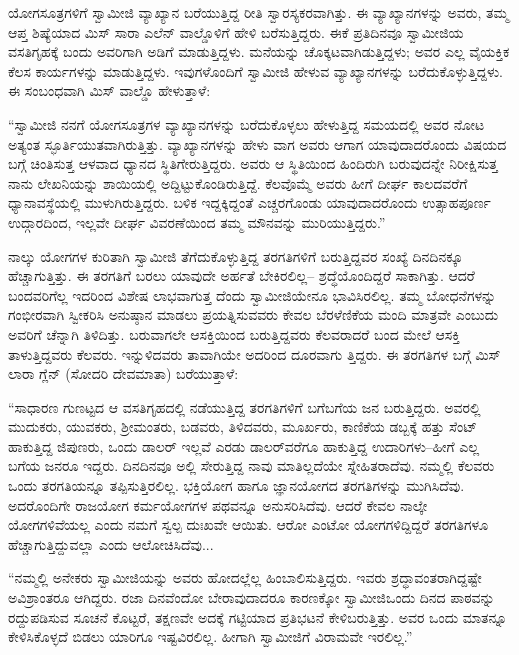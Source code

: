 ಯೋಗಸೂತ್ರಗಳಿಗೆ ಸ್ವಾಮೀಜಿ ವ್ಯಾಖ್ಯಾನ ಬರೆಯುತ್ತಿದ್ದ ರೀತಿ ಸ್ವಾರಸ್ಯಕರವಾಗಿತ್ತು. ಈ ವ್ಯಾಖ್ಯಾನಗಳನ್ನು ಅವರು, ತಮ್ಮ ಆಪ್ತ ಶಿಷ್ಯೆಯಾದ ಮಿಸ್ ಸಾರಾ ಎಲೆನ್ ವಾಲ್ಡೊಳಿಗೆ ಹೇಳಿ ಬರೆಸುತ್ತಿದ್ದರು. ಈಕೆ ಪ್ರತಿದಿನವೂ ಸ್ವಾಮೀಜಿಯ ವಸತಿಗೃಹಕ್ಕೆ ಬಂದು ಅವರಿಗಾಗಿ ಅಡಿಗೆ ಮಾಡುತ್ತಿದ್ದಳು. ಮನೆಯನ್ನು ಚೊಕ್ಕಟವಾಗಿಡುತ್ತಿದ್ದಳು; ಅವರ ಎಲ್ಲ ವೈಯಕ್ತಿಕ ಕೆಲಸ ಕಾರ್ಯಗಳನ್ನು ಮಾಡುತ್ತಿದ್ದಳು. ಇವುಗಳೊಂದಿಗೆ ಸ್ವಾಮೀಜಿ ಹೇಳುವ ವ್ಯಾಖ್ಯಾನಗಳನ್ನು ಬರೆದುಕೊಳ್ಳುತ್ತಿದ್ದಳು. ಈ ಸಂಬಂಧವಾಗಿ ಮಿಸ್ ವಾಲ್ಡೊ ಹೇಳುತ್ತಾಳೆ:

“ಸ್ವಾಮೀಜಿ ನನಗೆ ಯೋಗಸೂತ್ರಗಳ ವ್ಯಾಖ್ಯಾನಗಳನ್ನು ಬರೆದುಕೊಳ್ಳಲು ಹೇಳುತ್ತಿದ್ದ ಸಮಯದಲ್ಲಿ ಅವರ ನೋಟ ಅತ್ಯಂತ ಸ್ಫೂರ್ತಿಯುತವಾಗಿರುತ್ತಿತ್ತು. ವ್ಯಾಖ್ಯಾನಗಳನ್ನು ಹೇಳು ವಾಗ ಅವರು ಆಗಾಗ ಯಾವುದಾದರೊಂದು ವಿಷಯದ ಬಗ್ಗೆ ಚಿಂತಿಸುತ್ತ ಆಳವಾದ ಧ್ಯಾನದ ಸ್ಥಿತಿಗೇರುತ್ತಿದ್ದರು. ಅವರು ಆ ಸ್ಥಿತಿಯಿಂದ ಹಿಂದಿರುಗಿ ಬರುವುದನ್ನೇ ನಿರೀಕ್ಷಿಸುತ್ತ ನಾನು ಲೇಖನಿಯನ್ನು ಶಾಯಿಯಲ್ಲಿ ಅದ್ದಿಟ್ಟುಕೊಂಡಿರುತ್ತಿದ್ದೆ. ಕೆಲವೊಮ್ಮೆ ಅವರು ಹೀಗೆ ದೀರ್ಘ ಕಾಲದವರೆಗೆ ಧ್ಯಾನಾವಸ್ಥೆಯಲ್ಲಿ ಮುಳುಗಿರುತ್ತಿದ್ದರು. ಬಳಿಕ ಇದ್ದಕ್ಕಿದ್ದಂತೆ ಎಚ್ಚರಗೊಂಡು ಯಾವುದಾದರೊಂದು ಉತ್ಸಾಹಪೂರ್ಣ ಉದ್ಗಾರದಿಂದ, ಇಲ್ಲವೇ ದೀರ್ಘ ವಿವರಣೆಯಿಂದ ತಮ್ಮ ಮೌನವನ್ನು ಮುರಿಯುತ್ತಿದ್ದರು.”

ನಾಲ್ಕು ಯೋಗಗಳ ಕುರಿತಾಗಿ ಸ್ವಾಮೀಜಿ ತೆಗೆದುಕೊಳ್ಳುತ್ತಿದ್ದ ತರಗತಿಗಳಿಗೆ ಬರುತ್ತಿದ್ದವರ ಸಂಖ್ಯೆ ದಿನದಿನಕ್ಕೂ ಹೆಚ್ಚಾಗುತ್ತಿತ್ತು. ಈ ತರಗತಿಗೆ ಬರಲು ಯಾವುದೇ ಅರ್ಹತೆ ಬೇಕಿರಲಿಲ್ಲ– ಶ್ರದ್ಧೆಯೊಂದಿದ್ದರೆ ಸಾಕಾಗಿತ್ತು. ಆದರೆ ಬಂದವರಿಗೆಲ್ಲ ಇದರಿಂದ ವಿಶೇಷ ಲಾಭವಾಗುತ್ತ ದೆಂದು ಸ್ವಾಮೀಜಿಯೇನೂ ಭಾವಿಸಿರಲಿಲ್ಲ. ತಮ್ಮ ಬೋಧನೆಗಳನ್ನು ಗಂಭೀರವಾಗಿ ಸ್ವೀಕರಿಸಿ ಅನುಷ್ಠಾನ ಮಾಡಲು ಪ್ರಯತ್ನಿಸುವವರು ಕೇವಲ ಬೆರಳೆಣಿಕೆಯ ಮಂದಿ ಮಾತ್ರವೇ ಎಂಬುದು ಅವರಿಗೆ ಚೆನ್ನಾಗಿ ತಿಳಿದಿತ್ತು. ಬರುವಾಗಲೇ ಆಸಕ್ತಿಯಿಂದ ಬರುತ್ತಿದ್ದವರು ಕೆಲವರಾದರೆ ಬಂದ ಮೇಲೆ ಆಸಕ್ತಿ ತಾಳುತ್ತಿದ್ದವರು ಕೆಲವರು. ಇನ್ನುಳಿದವರು ತಾವಾಗಿಯೇ ಅದರಿಂದ ದೂರವಾಗು ತ್ತಿದ್ದರು. ಈ ತರಗತಿಗಳ ಬಗ್ಗೆ ಮಿಸ್ ಲಾರಾ ಗ್ಲೆನ್ (ಸೋದರಿ ದೇವಮಾತಾ) ಬರೆಯುತ್ತಾಳೆ:

“ಸಾಧಾರಣ ಗುಣಟ್ಟದ ಆ ವಸತಿಗೃಹದಲ್ಲಿ ನಡೆಯುತ್ತಿದ್ದ ತರಗತಿಗಳಿಗೆ ಬಗೆಬಗೆಯ ಜನ ಬರುತ್ತಿದ್ದರು. ಅವರಲ್ಲಿ ಮುದುಕರು, ಯುವಕರು, ಶ್ರೀಮಂತರು, ಬಡವರು, ತಿಳಿದವರು, ಮೂರ್ಖರು, ಕಾಣಿಕೆಯ ಡಬ್ಬಕ್ಕೆ ಹತ್ತು ಸೆಂಟ್ ಹಾಕುತ್ತಿದ್ದ ಜಿಪುಣರು, ಒಂದು ಡಾಲರ್ ಇಲ್ಲವೆ ಎರಡು ಡಾಲರ್​ವರೆಗೂ ಹಾಕುತ್ತಿದ್ದ ಉದಾರಿಗಳು–ಹೀಗೆ ಎಲ್ಲ ಬಗೆಯ ಜನರೂ ಇದ್ದರು. ದಿನದಿನವೂ ಅಲ್ಲಿ ಸೇರುತ್ತಿದ್ದ ನಾವು ಮಾತಿಲ್ಲದೆಯೇ ಸ್ನೇಹಿತರಾದೆವು. ನಮ್ಮಲ್ಲಿ ಕೆಲವರು ಒಂದು ತರಗತಿಯನ್ನೂ ತಪ್ಪಿಸುತ್ತಿರಲಿಲ್ಲ. ಭಕ್ತಿಯೋಗ ಹಾಗೂ ಜ್ಞಾನಯೋಗದ ತರಗತಿಗಳನ್ನು ಮುಗಿಸಿದೆವು. ಅದರೊಂದಿಗೇ ರಾಜಯೋಗ ಕರ್ಮಯೋಗಗಳ ಪಥವನ್ನೂ ಅನುಸರಿಸಿದೆವು. ಆದರೆ ಕೇವಲ ನಾಲ್ಕೇ ಯೋಗಗಳಿವೆಯಲ್ಲ ಎಂದು ನಮಗೆ ಸ್ವಲ್ಪ ದುಃಖವೇ ಆಯಿತು. ಆರೋ ಎಂಟೋ ಯೋಗಗಳಿದ್ದಿದ್ದರೆ ತರಗತಿಗಳೂ ಹೆಚ್ಚಾಗುತ್ತಿದ್ದುವಲ್ಲಾ ಎಂದು ಆಲೋಚಿಸಿದೆವು...

“ನಮ್ಮಲ್ಲಿ ಅನೇಕರು ಸ್ವಾಮೀಜಿಯನ್ನು ಅವರು ಹೋದಲ್ಲೆಲ್ಲ ಹಿಂಬಾಲಿಸುತ್ತಿದ್ದರು. ಇವರು ಶ್ರದ್ಧಾವಂತರಾಗಿದ್ದಷ್ಟೇ ಅವಿಶ್ರಾಂತರೂ ಆಗಿದ್ದರು. ರಜಾ ದಿನವೆಂದೋ ಬೇರಾವುದಾದರೂ ಕಾರಣಕ್ಕೋ ಸ್ವಾಮೀಜಿಒಂದು ದಿನದ ಪಾಠವನ್ನು ರದ್ದುಪಡಿಸುವ ಸೂಚನೆ ಕೊಟ್ಟರೆ, ತಕ್ಷಣವೇ ಅದಕ್ಕೆ ಗಟ್ಟಿಯಾದ ಪ್ರತಿಭಟನೆ ಕೇಳಿಬರುತ್ತಿತ್ತು. ಅವರ ಒಂದು ಮಾತನ್ನೂ ಕೇಳಿಸಿಕೊಳ್ಳದೆ ಬಿಡಲು ಯಾರಿಗೂ ಇಷ್ಟವಿರಲಿಲ್ಲ. ಹೀಗಾಗಿ ಸ್ವಾಮೀಜಿಗೆ ವಿರಾಮವೇ ಇರಲಿಲ್ಲ.”

